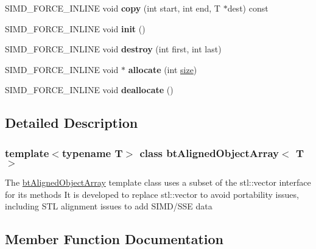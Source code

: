 \begin{DoxyCompactItemize}
S\+I\+M\+D\+\_\+\+F\+O\+R\+C\+E\+\_\+\+I\+N\+L\+I\+NE void {\bfseries copy} (int start, int end, T $\ast$dest) const
\item 
\mbox{\label{classbtAlignedObjectArray_a336631607f9f5f08001866ed11b5fd64}} 
S\+I\+M\+D\+\_\+\+F\+O\+R\+C\+E\+\_\+\+I\+N\+L\+I\+NE void {\bfseries init} ()
\item 
\mbox{\label{classbtAlignedObjectArray_a6dc404237b049258d12fb2ca62b934f7}} 
S\+I\+M\+D\+\_\+\+F\+O\+R\+C\+E\+\_\+\+I\+N\+L\+I\+NE void {\bfseries destroy} (int first, int last)
\item 
\mbox{\label{classbtAlignedObjectArray_a8943d09db3d72365b8c3ac6046225858}} 
S\+I\+M\+D\+\_\+\+F\+O\+R\+C\+E\+\_\+\+I\+N\+L\+I\+NE void $\ast$ {\bfseries allocate} (int \hyperlink{classbtAlignedObjectArray_a31de8d83d29c6edd1493fc583091194c}{size})
\item 
\mbox{\label{classbtAlignedObjectArray_acebca91940aecdb1c11718bc08b511c9}} 
S\+I\+M\+D\+\_\+\+F\+O\+R\+C\+E\+\_\+\+I\+N\+L\+I\+NE void {\bfseries deallocate} ()
\end{DoxyCompactItemize}


\subsection{Detailed Description}
\subsubsection*{template$<$typename T$>$\newline
class bt\+Aligned\+Object\+Array$<$ T $>$}

The \hyperlink{classbtAlignedObjectArray}{bt\+Aligned\+Object\+Array} template class uses a subset of the stl\+::vector interface for its methods It is developed to replace stl\+::vector to avoid portability issues, including S\+TL alignment issues to add S\+I\+M\+D/\+S\+SE data 

\subsection{Member Function Documentation}
\mbox{\label{classbtAlignedObjectArray_a2cc58c74534181a7a10e5c6ab8b21227}} 
